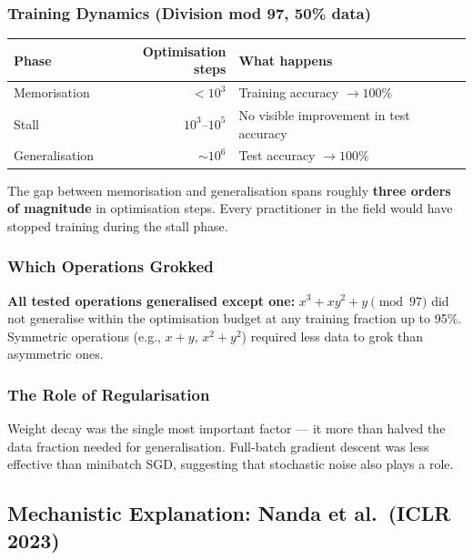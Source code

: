 \documentclass[11pt, a4paper]{article}
\theoremstyle{definition}
\theoremstyle{plain}
\begin{document}
\subsubsection{Training Dynamics (Division mod 97, 50\% data)}

\begin{center}
\begin{tabular}{lrl}
  \toprule
  \textbf{Phase} & \textbf{Optimisation steps} & \textbf{What happens} \\
  \midrule
  Memorisation & $< 10^3$ & Training accuracy $\to 100\%$ \\
  Stall & $10^3$--$10^5$ & No visible improvement in test accuracy \\
  Generalisation & ${\sim}10^6$ & Test accuracy $\to 100\%$ \\
  \bottomrule
\end{tabular}
\end{center}

The gap between memorisation and generalisation spans roughly \textbf{three orders of magnitude} in optimisation steps. Every practitioner in the field would have stopped training during the stall phase.

\subsubsection{Which Operations Grokked}

\textbf{All tested operations generalised except one:} $x^3 + xy^2 + y \pmod{97}$ did not generalise within the optimisation budget at any training fraction up to 95\%. Symmetric operations (e.g., $x + y$, $x^2 + y^2$) required less data to grok than asymmetric ones.

\subsubsection{The Role of Regularisation}

Weight decay was the single most important factor --- it more than halved the data fraction needed for generalisation. Full-batch gradient descent was less effective than minibatch SGD, suggesting that stochastic noise also plays a role.

\subsection{Mechanistic Explanation: Nanda et al.\ (ICLR 2023)}
\label{subsec:nanda}
\end{document}
